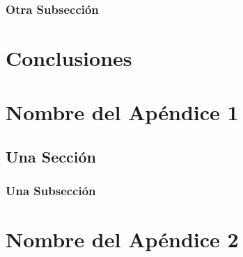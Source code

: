 \documentclass[12pt,a4paper,oneside]{book}
\begin{document}
\subsection{Otra Subsección}
\lipsum[2-5]

\chapter{Conclusiones}
\lipsum[1-6]








\appendix %


\chapter{Nombre del Apéndice 1} 
\lipsum[1]
\section{Una Sección}
\lipsum[2-3]
\subsection{Una Subsección}
\lipsum[4-6]

\chapter{Nombre del Apéndice 2} 
\lipsum[6-9]

\end{document}
